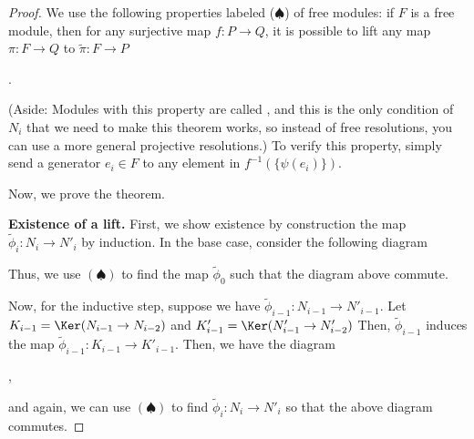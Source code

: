 \begin{proof}
    We use the following properties labeled ($\spadesuit$) 
    of free modules:
    if $F$ is a free module,
    then for any surjective map $f : P\to Q$,
    it is possible to lift any map $\pi : F\to Q$ to 
    $\widetilde\pi : F\to P$
    \begin{center}
    .
    \end{center}
    (Aside: Modules with this property are called 
    , and this is the only condition
    of $N_i$ that we need to make this theorem works,
    so instead of free resolutions, you can use a more general projective resolutions.)
    To verify this property, simply send
    a generator $e_i\in F$ to any element in 
    $f^{-1}(\{\psi(e_i)\})$.

    Now, we prove the theorem. 
    
    \textbf{Existence of a lift.}
    First, we show existence
    by construction the map $\widetilde\phi_i : N_i\to N'_i$ by induction.
    In the base case, consider the following diagram
    \begin{center}
    \end{center}
    Thus, we use $(\spadesuit)$ to find the map
    $\widetilde\phi_0$ such that the diagram above commute.

    Now, for the inductive step, suppose we have
    $\widetilde\phi_{i-1} : N_{i-1}\to N'_{i-1}$.
    Let $K_{i-1} = \Ker(N_{i-1}\to N_{i-2})$
    and $K'_{i-1} = \Ker(N'_{i-1}\to N'_{i-2})$
    Then, $\widetilde\phi_{i-1}$ 
    induces the map $\widetilde\phi_{i-1} : 
    K_{i-1} \to K'_{i-1}$. Then, we have the diagram
    \begin{center}
    ,
    \end{center}
    and again, we can use $(\spadesuit)$
    to find $\widetilde\phi_i : N_i\to N'_i$
    so that the above diagram commutes.


\end{proof}
